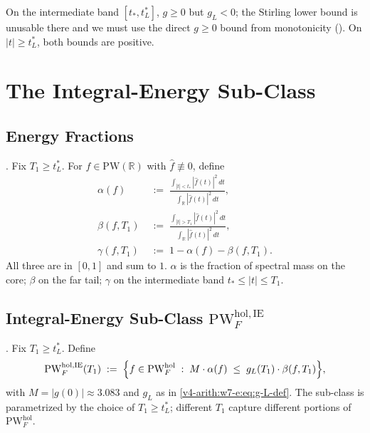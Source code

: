 On the intermediate band \([t_{\ast},t_{L}^{\ast}]\), \(g\geq 0\) but
\(g_{L}<0\); the Stirling lower bound is unusable there and we must use
the direct \(g\geq 0\) bound from monotonicity
(). On \(|t|\geq t_{L}^{\ast}\), both
bounds are positive.

\section{The Integral-Energy Sub-Class}
\label{v4-arith:w7-e:integral-energy}

\subsection{Energy Fractions}
\label{v4-arith:w7-e:energy-fractions}

\begin{definition}
\label{v4-arith:w7-e:def:energy-fractions}
\ClaimStatusDefinitional. Fix \(T_{1}\geq t_{L}^{\ast}\). For
\(f\in\mathrm{PW}(\mathbb{R})\) with \(\widehat{f}\not\equiv 0\), define
\begin{align}
\label{v4-arith:w7-e:eq:alpha-core}
\alpha(f)&\;:=\;\frac{\int_{|t|<t_{\ast}}|\widehat{f}(t)|^{2}\,dt}{\int_{\mathbb{R}}|\widehat{f}(t)|^{2}\,dt},\\
\label{v4-arith:w7-e:eq:beta-far}
\beta(f,T_{1})&\;:=\;\frac{\int_{|t|>T_{1}}|\widehat{f}(t)|^{2}\,dt}{\int_{\mathbb{R}}|\widehat{f}(t)|^{2}\,dt},\\
\label{v4-arith:w7-e:eq:gamma-mid}
\gamma(f,T_{1})&\;:=\;1-\alpha(f)-\beta(f,T_{1}).
\end{align}
All three are in \([0,1]\) and sum to \(1\). \(\alpha\) is the fraction of
spectral mass on the core; \(\beta\) on the far tail; \(\gamma\) on the
intermediate band \(t_{\ast}\leq|t|\leq T_{1}\).
\end{definition}

\subsection{Integral-Energy Sub-Class \(\mathrm{PW}^{\mathrm{hol},\mathrm{IE}}_{F}\)}
\label{v4-arith:w7-e:IE-definition}

\begin{definition}
\label{v4-arith:w7-e:def:IE-subclass}
\ClaimStatusDefinitional. Fix \(T_{1}\geq t_{L}^{\ast}\). Define
\begin{equation}
\label{v4-arith:w7-e:eq:IE-condition}
\mathrm{PW}^{\mathrm{hol},\mathrm{IE}}_{F}(T_{1})\;:=\;\Bigl\{f\in\mathrm{PW}^{\mathrm{hol}}_{F}\;:\;
M\cdot\alpha(f)\;\leq\;g_{L}(T_{1})\cdot\beta(f,T_{1})\Bigr\},
\end{equation}
with \(M=|g(0)|\approx 3.083\) and \(g_{L}\) as in
\eqref{v4-arith:w7-e:eq:g-L-def}. The sub-class is parametrized by
the choice of \(T_{1}\geq t_{L}^{\ast}\); different \(T_{1}\) capture
different portions of \(\mathrm{PW}^{\mathrm{hol}}_{F}\).
\end{definition}

